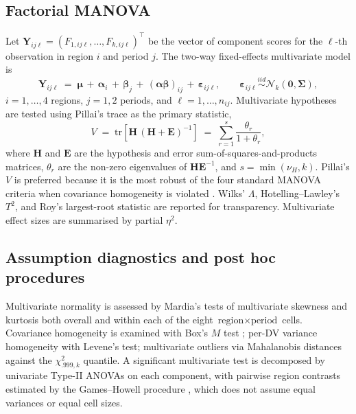 \documentclass[12pt,letterpaper]{article}
\begin{document}
\subsection{Factorial MANOVA}

Let $\bm{Y}_{ij\ell} = (F_{1,ij\ell}, \dots, F_{k,ij\ell})^{\!\top}$ be the
vector of component scores for the $\ell$-th observation in region $i$ and
period $j$.  The two-way fixed-effects multivariate model is
\begin{equation}
  \bm{Y}_{ij\ell} \;=\; \bm{\mu} \,+\, \bm{\alpha}_{i} \,+\, \bm{\beta}_{j}
  \,+\, (\bm{\alpha\beta})_{ij} \,+\, \bm{\varepsilon}_{ij\ell},
  \qquad
  \bm{\varepsilon}_{ij\ell} \overset{iid}{\sim} \mathcal{N}_{k}(\bm{0},\bm{\Sigma}),
  \label{eq:manova}
\end{equation}
$i = 1,\dots,4$ regions, $j=1,2$ periods, and $\ell = 1,\dots,n_{ij}$.
Multivariate hypotheses are tested using Pillai's trace as the primary statistic,
\begin{equation}
  V \;=\; \mathrm{tr}\!\left[\bm{H}\,(\bm{H}+\bm{E})^{-1}\right]
        \;=\; \sum_{r=1}^{s}\frac{\theta_{r}}{1+\theta_{r}},
  \label{eq:pillai}
\end{equation}
where $\bm{H}$ and $\bm{E}$ are the hypothesis and error sum-of-squares-and-products
matrices, $\theta_{r}$ are the non-zero eigenvalues of $\bm{H}\bm{E}^{-1}$, and
$s = \min(\nu_{H},k)$.  Pillai's $V$ is preferred because it is the
{most robust} of the four standard MANOVA criteria when covariance
homogeneity is violated \citep{pillai1955,tabachnick2019}.  Wilks' $\Lambda$,
Hotelling--Lawley's $T^{2}$, and Roy's largest-root statistic are reported for
transparency.  Multivariate effect sizes are summarised by partial $\eta^{2}$.

\subsection{Assumption diagnostics and post hoc procedures}

Multivariate normality is assessed by Mardia's tests of multivariate skewness
and kurtosis \citep{mardia1970} both overall and within each of the eight
$\text{region}\times\text{period}$ cells.  Covariance homogeneity is examined
with Box's $M$ test \citep{box1949}; per-DV variance homogeneity with Levene's
test; multivariate outliers via Mahalanobis distances against the
$\chi^{2}_{.999,k}$ quantile.  A significant multivariate test is decomposed by
univariate Type-II ANOVAs on each component, with pairwise region contrasts
estimated by the Games--Howell procedure \citep{games1976}, which does not
assume equal variances or equal cell sizes.
\end{document}
